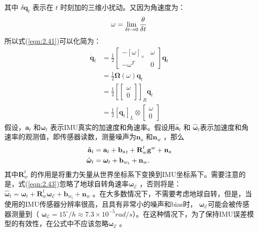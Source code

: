 其中 $\delta \mathbf{q}_t $ 表示在 $t$  时刻加的三维小扰动。又因为角速度为：
\[
\setlength{\abovedisplayskip}{6pt}
\setlength{\belowdisplayskip}{6pt}
{\omega}=\lim _{\delta t \rightarrow 0} \frac{\theta}{\delta t} 
\]
所以式(\ref{eqn:2.41})可以化简为：
\begin{equation}
\label{eqn:2.42}
\begin{aligned}
\dot{\mathbf{q}}_{t}&=\frac{1}{2} \left[ \begin{array}{cc}{-[\omega]_{\times}} & {\omega} \\ {-\omega^{T}} & {0}\end{array}\right] \mathbf{q}_{t} \\  
&= \frac{1}{2} \bm{\Omega}(\omega) \mathbf{q}_{t} \\
&= \frac{1}{2} {\left[\left[ \begin{array}{l}{\omega} \\ {0}\end{array}\right]\right]}_R \mathbf{q}_{t} \\
&= \frac{1}{2} \left[\mathbf{q}_{t}\right]_L \otimes \left[ \begin{array}{l}{\omega} \\ {0}\end{array}\right]
\end{aligned}
\end{equation}
假设，$\mathbf{a}_t $ 和$\bm{\omega}_t $ 表示IMU真实的加速度和角速率。假设用$\hat{\textbf{a}}_t $ 和 $\hat{\bm{\omega}}_t $表示加速度和角速率的观测值，即传感器读数，测量噪声为$\mathbf{n}_a $ 和$\mathbf{n}_w $ ，那么
\begin{equation}
\label{eqn:2.43}
\setlength{\abovedisplayskip}{6pt}
\setlength{\belowdisplayskip}{6pt}
\begin{split}
\hat{\textbf{a}}_t&=\textbf{a}_t+{\textbf{b}_a}_t+\textbf{R}_w^t\textbf{g}^w+\textbf{n}_a \\
\hat{\bm{\omega}}_t&=\bm{\omega}_t+\mathbf{b}_{w_t}+\mathbf{n}_w.
\end{split}
\end{equation}
其中$\mathbf{R}_w^t $ 的作用是将重力矢量从世界坐标系下变换到IMU坐标系下。需要注意的是，式(\ref{eqn:2.43})忽略了地球自转角速率$\bm{\omega}_\mathcal{E} $ ，否则将是：$\hat{\bm{\omega}}_t=\bm{\omega}_t+ \mathbf{R}_w^t \bm{\omega}_\mathcal{E} +\mathbf{b}_{w_t}+\mathbf{n}_w $ 。在大多数情况下，不需要考虑地球自转，但是，当使用的IMU传感器分辨率很高，且具有非常小的噪声和bias时， $\bm{\omega}_\mathcal{E} $可能会被传感器测量到（ $\bm{\omega}_\mathcal{E} = {15}^{\circ}/h \approx 7.3×10^{-5} rad/s $）。在这种情况下，为了保持IMU误差模型的有效性，在公式中不应该忽略$\bm{\omega}_\mathcal{E} $ 。

